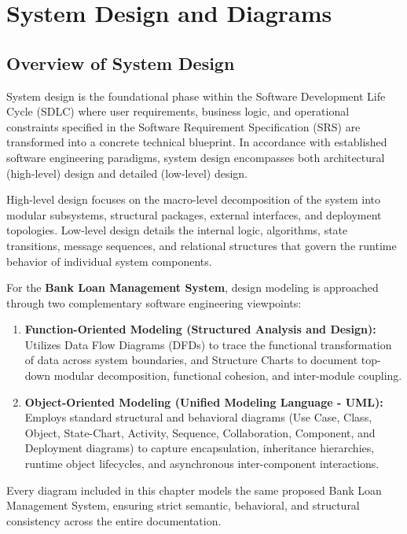 \chapter{System Design and Diagrams}

\section{Overview of System Design}

System design is the foundational phase within the Software Development Life Cycle (SDLC) where user requirements, business logic, and operational constraints specified in the Software Requirement Specification (SRS) are transformed into a concrete technical blueprint. In accordance with established software engineering paradigms, system design encompasses both architectural (high-level) design and detailed (low-level) design.

High-level design focuses on the macro-level decomposition of the system into modular subsystems, structural packages, external interfaces, and deployment topologies. Low-level design details the internal logic, algorithms, state transitions, message sequences, and relational structures that govern the runtime behavior of individual system components.

For the \textbf{Bank Loan Management System}, design modeling is approached through two complementary software engineering viewpoints:

\begin{enumerate}
  \item \textbf{Function-Oriented Modeling (Structured Analysis and Design):} Utilizes Data Flow Diagrams (DFDs) to trace the functional transformation of data across system boundaries, and Structure Charts to document top-down modular decomposition, functional cohesion, and inter-module coupling.
  \item \textbf{Object-Oriented Modeling (Unified Modeling Language - UML):} Employs standard structural and behavioral diagrams (Use Case, Class, Object, State-Chart, Activity, Sequence, Collaboration, Component, and Deployment diagrams) to capture encapsulation, inheritance hierarchies, runtime object lifecycles, and asynchronous inter-component interactions.
\end{enumerate}

Every diagram included in this chapter models the same proposed Bank Loan Management System, ensuring strict semantic, behavioral, and structural consistency across the entire documentation.

